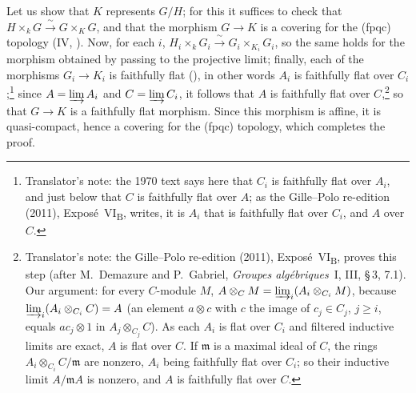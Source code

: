 Let us show that \(K\) represents \(G/H\); for this it suffices to check that
\(H\times_kG\xrightarrow{\ \sim\ }G\times_KG\), and that the morphism \(G\to K\) is a
covering for the \textup{(fpqc)} topology
\textup{(IV, )}. Now, for each \(i\),
\(H_i\times_kG_i\xrightarrow{\ \sim\ }G_i\times_{K_i}G_i\), so the same holds for the
morphism obtained by passing to the projective limit; finally, each of the morphisms
\(G_i\to K_i\) is faithfully flat
\textup{()}, in other words \(A_i\) is
faithfully flat over \(C_i\);\footnote{Translator's note: the 1970 text says here that \(C_i\) is faithfully flat
over \(A_i\), and just below that \(C\) is faithfully flat over \(A\); as the Gille--Polo re-edition (2011),
Expos\'e~VI\textsubscript{B}, writes, it is \(A_i\) that is faithfully flat over \(C_i\), and \(A\) over \(C\).} since \(A=\varinjlim A_i\) and \(C=\varinjlim C_i\), it
follows that \(A\) is faithfully flat over \(C\),\footnote{Translator's note: the Gille--Polo
re-edition (2011), Expos\'e~VI\textsubscript{B}, proves this step (after M.~Demazure and P.~Gabriel, \emph{Groupes
alg\'ebriques}~I, III, \S\,3, 7.1). Our argument: for every \(C\)-module \(M\),
\(A\otimes_CM=\varinjlim_i(A_i\otimes_{C_i}M)\), because \(\varinjlim_i(A_i\otimes_{C_i}C)=A\) (an element
\(a\otimes c\) with \(c\) the image of \(c_j\in C_j\), \(j\geq i\), equals \(ac_j\otimes1\) in
\(A_j\otimes_{C_j}C\)). As each \(A_i\) is flat over \(C_i\) and filtered inductive limits are exact, \(A\) is
flat over \(C\). If \(\mathfrak m\) is a maximal ideal of \(C\), the rings \(A_i\otimes_{C_i}C/\mathfrak m\) are
nonzero, \(A_i\) being faithfully flat over \(C_i\); so their inductive limit \(A/\mathfrak mA\) is nonzero, and
\(A\) is faithfully flat over \(C\).} so that \(G\to K\) is a faithfully flat
morphism. Since this morphism is affine, it is quasi-compact, hence a covering for the
\textup{(fpqc)} topology, which completes the proof.

